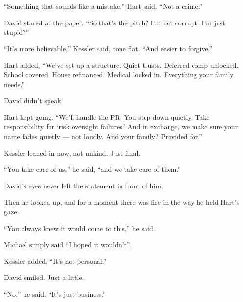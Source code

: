 “Something that sounds like a mistake,” Hart said. “Not a crime.”

David stared at the paper. “So that’s the pitch? I’m not corrupt. I'm just stupid?”

“It’s more believable,” Kessler said, tone flat. “And easier to forgive.”

Hart added, “We’ve set up a structure. Quiet trusts. Deferred comp unlocked. School covered. 
House refinanced. Medical locked in. Everything your family needs.”

David didn’t speak.

Hart kept going. “We’ll handle the PR. You step down quietly. Take responsibility for ‘risk 
oversight failures.’ And in exchange, we make sure your name fades quietly — not loudly. 
And your family? Provided for.”

Kessler leaned in now, not unkind. Just final.

“You take care of us,” he said, “and we take care of them.”

David’s eyes never left the statement in front of him.

Then he looked up, and for a moment there was fire in the way he held Hart’s gaze.

“You always knew it would come to this,” he said.

Michael simply said ``I hoped it wouldn't''.

Kessler added, ``It’s not personal.''

David smiled. Just a little.

``No,'' he said. ``It’s just business.''

\medskip

